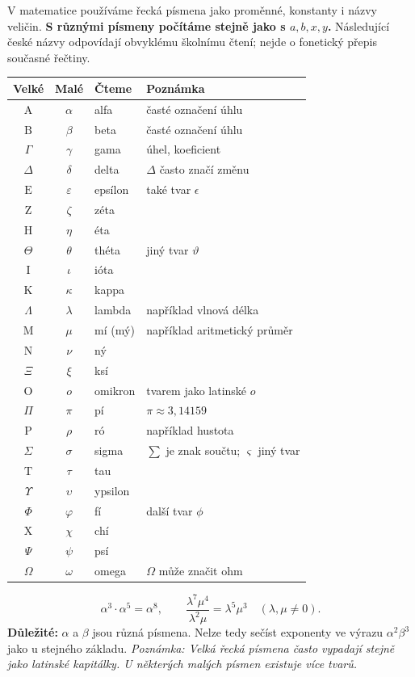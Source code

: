 \documentclass[11pt,a4paper]{article}
\begin{document}
V matematice používáme řecká písmena jako proměnné, konstanty i názvy veličin.
\textbf{S různými písmeny počítáme stejně jako s $a,b,x,y$.}
Následující české názvy odpovídají obvyklému školnímu čtení;
nejde o fonetický přepis současné řečtiny.
\vspace{2mm}
\begin{center}
\renewcommand{\arraystretch}{1.21}
\begin{tabularx}{\linewidth}{@{}c c l X@{}}
\toprule
\textbf{Velké} & \textbf{Malé} & \textbf{Čteme} & \textbf{Poznámka} \\\midrule
$\mathrm A$ & $\alpha$ & alfa & časté označení úhlu \\
$\mathrm B$ & $\beta$ & beta & časté označení úhlu \\
$\Gamma$ & $\gamma$ & gama & úhel, koeficient \\
$\Delta$ & $\delta$ & delta & $\Delta$ často značí změnu \\
$\mathrm E$ & $\varepsilon$ & epsílon & také tvar $\epsilon$ \\
$\mathrm Z$ & $\zeta$ & zéta &  \\
$\mathrm H$ & $\eta$ & éta &  \\
$\Theta$ & $\theta$ & théta & jiný tvar $\vartheta$ \\
$\mathrm I$ & $\iota$ & ióta &  \\
$\mathrm K$ & $\kappa$ & kappa &  \\
$\Lambda$ & $\lambda$ & lambda & například vlnová délka \\
$\mathrm M$ & $\mu$ & mí (mý) & například aritmetický průměr \\
$\mathrm N$ & $\nu$ & ný &  \\
$\Xi$ & $\xi$ & ksí &  \\
$\mathrm O$ & $o$ & omikron & tvarem jako latinské $o$ \\
$\Pi$ & $\pi$ & pí & $\pi\approx3{,}14159$ \\
$\mathrm P$ & $\rho$ & ró & například hustota \\
$\Sigma$ & $\sigma$ & sigma & $\sum$ je znak součtu; $\varsigma$ jiný tvar \\
$\mathrm T$ & $\tau$ & tau &  \\
$\Upsilon$ & $\upsilon$ & ypsilon &  \\
$\Phi$ & $\varphi$ & fí & další tvar $\phi$ \\
$\mathrm X$ & $\chi$ & chí &  \\
$\Psi$ & $\psi$ & psí &  \\
$\Omega$ & $\omega$ & omega & $\Omega$ může značit ohm \\\bottomrule
\end{tabularx}
\end{center}
\[
\alpha^3\cdot\alpha^5=\alpha^8,
\qquad
\frac{\lambda^7\mu^4}{\lambda^2\mu}=\lambda^5\mu^3
\quad(\lambda,\mu\ne0).
\]
\textbf{Důležité:} $\alpha$ a $\beta$ jsou různá písmena. Nelze tedy
sečíst exponenty ve výrazu $\alpha^2\beta^3$ jako u stejného základu.
\small\textit{Poznámka: Velká řecká písmena často vypadají stejně jako
latinské kapitálky. U některých malých písmen existuje více tvarů.}\par\normalsize
\end{document}
